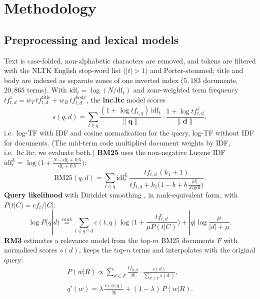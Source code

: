\documentclass[conference]{IEEEtran}
\begin{document}
\section{Methodology}
\subsection{Preprocessing and lexical models}
Text is case-folded, non-alphabetic characters are removed, and tokens are filtered with the NLTK English stop-word list
($|t|>1$) and Porter-stemmed; title and body are indexed as separate zones of one inverted index ($5{,}183$ documents,
$20{,}865$ terms). With $\mathrm{idf}_t=\log(N/\mathrm{df}_t)$ and zone-weighted term frequency
$tf^{z}_{t,d}=w_{T}\,tf^{\text{title}}_{t,d}+w_{B}\,tf^{\text{body}}_{t,d}$, the \textbf{lnc.ltc} model scores
\begin{equation}
s(q,d)=\sum_{t\in q}\frac{(1+\log tf_{t,q})\,\mathrm{idf}_t}{\lVert\mathbf{q}\rVert}\cdot\frac{1+\log tf^{z}_{t,d}}{\lVert\mathbf{d}\rVert},
\end{equation}
i.e.\ log-TF with IDF and cosine normalisation for the query, log-TF without IDF for documents. (The mid-term code
multiplied document weights by IDF, i.e.\ ltc.ltc; we evaluate both.) \textbf{BM25} uses the non-negative Lucene IDF $\mathrm{idf}^{L}_t=\log\big(1+\frac{N-\mathrm{df}_t+0.5}{\mathrm{df}_t+0.5}\big)$:
\begin{equation}
\mathrm{BM25}(q,d)=\sum_{t\in q}\mathrm{idf}^{L}_t\,\frac{tf_{t,d}\,(k_1+1)}{tf_{t,d}+k_1\big(1-b+b\,\frac{|d|}{\mathrm{avgdl}}\big)}.
\end{equation}
\textbf{Query likelihood} with Dirichlet smoothing \cite{zhai2001smoothing}, in rank-equivalent form, with $P(t|C)=cf_t/|C|$:
\begin{equation}
\log P(q|d)\stackrel{rank}{=}\!\sum_{t\in q\cap d}\!c(t,q)\log\!\Big(1+\frac{tf_{t,d}}{\mu P(t|C)}\Big)+|q|\log\frac{\mu}{|d|+\mu}.
\end{equation}
\textbf{RM3} \cite{lavrenko2001relevance} estimates a relevance model from the top-$m$ BM25 documents $F$ with
normalised scores $s(d)$, keeps the top-$n$ terms and interpolates with the original query:
\begin{gather}
P(w|R)\propto\sum_{d\in F}\frac{tf_{w,d}}{|d|}\cdot\frac{s(d)}{\sum_{d'\in F}s(d')},\\
q'(w)=\lambda\,\frac{c(w,q)}{|q|}+(1-\lambda)\,P(w|R).
\end{gather}
\end{document}
